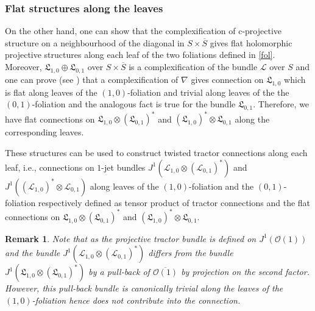 \documentclass{amsart}
\newtheorem{rem}{Remark}[section]
\begin{document}
\subsubsection{Flat structures along the leaves}\label{flat} On the other hand, one can show that the complexification of c-projective structure on a neighbourhood of the diagonal in $S\times\overline{S}$ gives flat holomorphic projective structures along each leaf of the two foliations defined in \ref{fol}. Moreover,  $\mathfrak{L}_{1,0}\oplus\mathfrak{L}_{0,1}$ over $S\times\overline{S}$ is a complexification of the bundle $\mathcal{L}$ over $S$ and one can prove (see \cite{BC}) that a complexification of $\nabla$ gives connection  on $\mathfrak{L}_{1,0}$ which is flat along leaves of the $(1,0)$-foliation and trivial along leaves of the the $(0,1)$-foliation and the analogous fact is true for the bundle $\mathfrak{L}_{0,1}$. Therefore, we have flat connections on $\mathfrak{L}_{1,0}\otimes(\mathfrak{L}_{0,1})^*$ and $(\mathfrak{L}_{1,0})^*\otimes\mathfrak{L}_{0,1} $ along the corresponding leaves.



These structures can be used to construct twisted tractor connections along each leaf, i.e., connections on $1$-jet bundles $J^1( \mathcal{L}_{1,0}\otimes(\mathcal{L}_{0,1})^*)$ and $J^1((\mathcal{L}_{1,0})^*\otimes\mathcal{L}_{0,1})$ along leaves of  the $(1,0)$-foliation and the $(0,1)$-foliation respectively defined as tensor product of tractor connections and the flat connections on $\mathfrak{L}_{1,0}\otimes(\mathfrak{L}_{0,1})^*$ and $(\mathfrak{L}_{1,0})^*\otimes\mathfrak{L}_{0,1} $.
\begin{rem}
    Note that as the projective tractor bundle is defined on $J^1(\mathcal{O}(1))$ and the bundle $ J^1(\mathcal{L}_{1,0}\otimes(\mathcal{L}_{0,1})^*)$ differs from the bundle $J^1(\mathfrak{L}_{1,0}\otimes(\mathfrak{L}_{0,1})^*) $ by a pull-back of $\overline{\mathcal{O}(1)}$ by projection on the second factor. However, this pull-back bundle is canonically trivial along the leaves of the $(1,0)$-foliation hence does not contribute into the connection. 
\end{rem}
\end{document}
